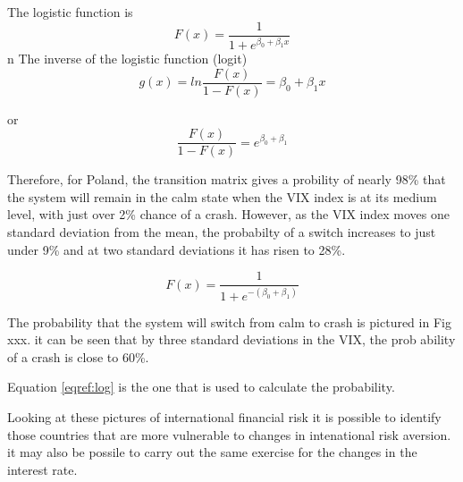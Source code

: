 \documentclass[12pt, a4paper, oneside]{article} %
\begin{document}
The logistic function is 
\begin{equation}
F(x)  = \frac{1}{1 + e^{\beta_0 + \beta_1 x}}
\end{equation}
n
The inverse of the logistic function (logit)
\begin{equation}
g(x) = ln\frac{F(x)}{1-F(x)} = \beta_0 +\beta_1x
\end{equation}

or 
\begin{equation}
\frac{F(x)}{1 - F(x)} = e^{\beta_0 + \beta_1}
\end{equation}

Therefore, for Poland, the transition matrix gives a probility of nearly 98\% that the system will remain in the calm state when the VIX index is at its medium level, with just over 2\% chance of a crash.  However, as the VIX index moves one standard deviation from the mean, the probabilty of a switch increases to just under 9\% and at two standard deviations it has risen to 28\%.  

\begin{equation}
\label{eqref:log}
F(x) = \frac{1}{1 + e^{-(\beta_0 + \beta_1)}}
\end{equation}

The probability that the system will switch from calm to crash is pictured in Fig xxx.  it can be seen that by three standard deviations in the VIX, the prob ability of a crash is close to 60\%.  

Equation \ref{eqref:log} is the one that is used to calculate the probability. 

Looking at these pictures of international financial risk it is possible to identify those countries that are more vulnerable to changes in intenational risk aversion. it may also be possile to carry out the same exercise for the changes in the interest rate.  
\end{document}
